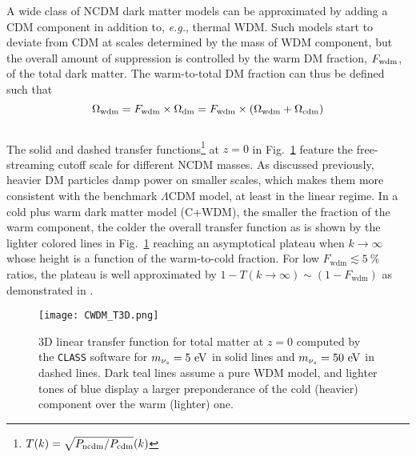 A wide class of NCDM dark matter models can be approximated by adding a CDM component in addition to, \textit{e.g.}, thermal WDM. Such models start to deviate from CDM at scales determined by the mass of WDM component, but the overall amount of suppression is controlled by the 
warm DM fraction, $F_{\rm{wdm}}$, of the total dark matter. The warm-to-total DM fraction can thus be defined such that \\
\begin{equation}
\Omega_{\rm{wdm}} = F_{\rm{wdm}} \times \Omega_{\rm{dm}} = F_{\rm{wdm}} \times \left( \Omega_{\rm{wdm}} + \Omega_{\rm{cdm}} \right) 
\label{eq:Fwdm}
\end{equation} \\ The solid and dashed transfer functions\footnote{$T(k) = \sqrt{P_{\rm{ncdm}}/P_{\rm{cdm}}}(k)$} at $z=0$ in Fig.~\ref{fig:pk_cwdm} feature the free-streaming cutoff scale for different NCDM masses. As discussed previously, heavier DM particles damp power on smaller scales, which makes them more consistent with the benchmark $\Lambda$CDM model, at least in the linear regime.
In a cold plus warm dark matter model (C+WDM), the smaller the fraction of the warm component, the colder the overall transfer function as is shown by the lighter colored lines in Fig.~\ref{fig:pk_cwdm} reaching an asymptotical plateau when $k \rightarrow \infty$ whose height is a function of the warm-to-cold fraction. For low $F_{\mathrm{wdm}} \lesssim 5~\%$ ratios, the plateau is well approximated by $1-T(k \rightarrow \infty) \sim (1-F_{\mathrm{wdm}})$ as demonstrated in \cite{BLR09}. \\

\begin{figure}
\begin{center}
\texttt{[image: CWDM\_T3D.png]}
\caption{3D linear transfer function for total matter at $z=0$ computed by the \texttt{CLASS} software for $m_{\nu_s} = 5~\rm{eV}$ in solid lines and $m_{\nu_s} = 50~\rm{eV}$ in dashed lines. Dark teal lines assume a pure WDM model, and lighter tones of blue display a larger preponderance of the cold (heavier) component over the warm (lighter) one.}
\label{fig:pk_cwdm}
\end{center}
\end{figure}

